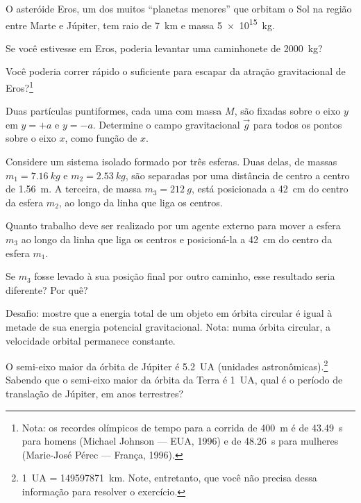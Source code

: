 \documentclass[a4paper]{article}
\begin{document}
\begin{exercicio}
 O asteróide Eros, um dos muitos ``planetas menores'' que orbitam o Sol na região entre Marte e Júpiter, tem raio de \SI{7}{km} e massa \SI{5e15}{kg}.
\begin{compactenum}[(a)]
\item Se você estivesse em Eros, poderia levantar uma caminhonete de \SI{2000}{kg}?
\item Você poderia correr rápido o suficiente para escapar da atração gravitacional de Eros?\footnote{Nota: os recordes olímpicos de tempo para a corrida de \SI{400}{m} é de \SI{43.49}{s} para homens (Michael Johnson --- EUA, 1996) e de \SI{48.26}{s} para mulheres (Marie-José Pérec --- França, 1996).}
\end{compactenum}
\end{exercicio}

\begin{exercicio}
 Duas partículas puntiformes, cada uma com massa $M$, são fixadas sobre o eixo $y$ em $y=+a$ e $y=-a$.
Determine o campo gravitacional $\vec g$ para todos os pontos sobre o eixo $x$, como função de $x$.
\end{exercicio}

\begin{exercicio}
 Considere um sistema isolado formado por três esferas. Duas delas, de massas $m_1 = \SI{7.16}{kg}$ e $m_2 = \SI{2.53}{kg}$, são separadas por uma distância de centro a centro de \SI{1.56}{m}. A terceira, de massa $m_3 = \SI{212}{g}$, está posicionada a \SI{42}{cm} do centro da esfera $m_2$, ao longo da linha que liga os centros.
\begin{compactenum}[(a)]
\item Quanto trabalho deve ser realizado por um agente externo para mover a esfera $m_3$ ao longo da linha que liga os centros e posicioná-la a \SI{42}{cm} do centro da esfera $m_1$.
\item Se $m_3$ fosse levado à sua posição final por outro caminho, esse resultado seria diferente? Por quê?
\end{compactenum}
\end{exercicio}

\begin{exercicio}
 Desafio: mostre que a energia total de um objeto em órbita circular é igual à metade de sua energia potencial gravitacional.
Nota: numa órbita circular, a velocidade orbital permanece constante.
\end{exercicio}

\begin{exercicio}
 O semi-eixo maior da órbita de Júpiter é \SI{5.2}{UA} (unidades astronômicas).\footnote{\SI{1}{UA} = \SI{149 597 871}{km}. Note, entretanto, que você não precisa dessa informação para resolver o exercício.}
Sabendo que o semi-eixo maior da órbita da Terra é \SI{1}{UA}, qual é o período de translação de Júpiter, em anos terrestres?
\end{exercicio}
\end{document}
